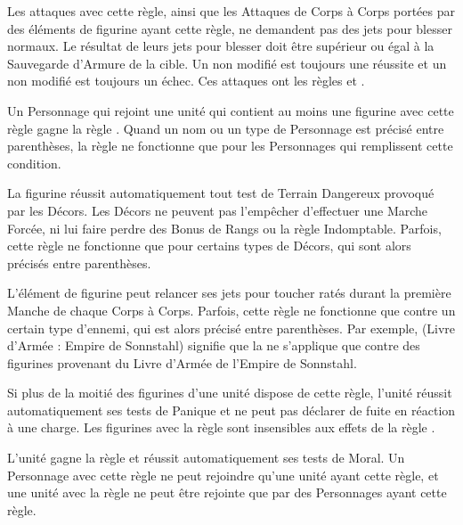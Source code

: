 
Les attaques avec cette règle, ainsi que les Attaques de Corps à Corps portées par des éléments de figurine ayant cette règle, ne demandent pas des jets pour blesser normaux. Le résultat de leurs jets pour blesser doit être supérieur ou égal à la Sauvegarde d'Armure de la cible. Un  non modifié est toujours une réussite et un  non modifié est toujours un échec. Ces attaques ont les règles \flamingattacks{} et .


Un Personnage qui rejoint une unité qui contient au moins une figurine avec cette règle gagne la règle \stubborn{}. Quand un nom ou un type de Personnage est précisé entre parenthèses, la règle ne fonctionne que pour les Personnages qui remplissent cette condition.


La figurine réussit automatiquement tout test de Terrain Dangereux provoqué par les Décors. Les Décors ne peuvent pas l'empêcher d'effectuer une Marche Forcée, ni lui faire perdre des Bonus de Rangs ou la règle Indomptable. Parfois, cette règle ne fonctionne que pour certains types de Décors, qui sont alors précisés entre parenthèses.


L'élément de figurine peut relancer ses jets pour toucher ratés durant la première Manche de chaque Corps à Corps. Parfois, cette règle ne fonctionne que contre un certain type d'ennemi, qui est alors précisé entre parenthèses. Par exemple, \og \hatred{} (Livre d'Armée : Empire de Sonnstahl) \fg{} signifie que la \hatred{} ne s'applique que contre des figurines provenant du Livre d'Armée de l'Empire de Sonnstahl.


Si plus de la moitié des figurines d'une unité dispose de cette règle, l'unité réussit automatiquement ses tests de Panique et ne peut pas déclarer de fuite en réaction à une charge. Les figurines avec la règle \immunetopsychology{} sont insensibles aux effets de la règle \fear{}.


L'unité gagne la règle \immunetopsychology{} et réussit automatiquement ses tests de Moral. Un Personnage avec cette règle ne peut rejoindre qu'une unité ayant cette règle, et une unité avec la règle \unbreakable{} ne peut être rejointe que par des Personnages ayant cette règle.

